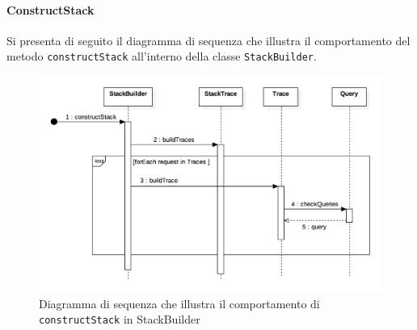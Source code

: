 \paragraph{ConstructStack}
Si presenta di seguito il diagramma di sequenza che illustra il comportamento del metodo \texttt{constructStack} all'interno della classe \texttt{StackBuilder}.
\begin{figure}[H]
	\centering
	\includegraphics[width=1\textwidth]{Images/stack_SequenceDiagram.png}
	\caption{Diagramma di sequenza che illustra il comportamento di \texttt{constructStack} in StackBuilder}
	\label{img:sequenceBuildLinks}
\end{figure}












